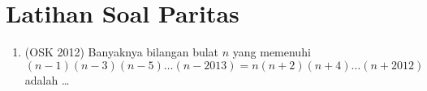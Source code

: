 \documentclass[12pt]{scrartcl}
\begin{document}

    
    
    
    


\section{Latihan Soal Paritas}
\begin{enumerate}
\item (OSK 2012) Banyaknya bilangan bulat $n$ yang memenuhi $$(n-1)(n-3)(n-5)\dots(n-2013)=n(n+2)(n+4)\dots (n+2012)$$ adalah \dots
\end{enumerate}
\end{document}
